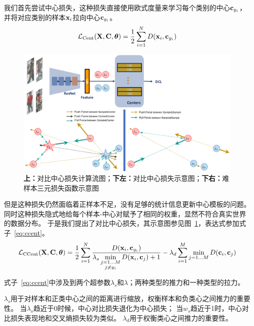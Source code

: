 我们首先尝试中心损失，这种损失直接使用欧式度量来学习每个类别的中心${\mathbf{c}}_{y_i}$，并将对应类别的样本${\mathbf{x}}_i$拉向中心${\mathbf{c}}_{y_i}$。
\begin{equation}
	\mathcal{L}_{\textrm{Cent}} ({\mathbf{X}}, {\mathbf{C}}, {\boldsymbol{\theta}}) = \frac{1}{2}
	\sum_{i=1}^{N}  D(
	{\mathbf{x}}_i , {\mathbf{c}}_{y_i} )
\end{equation}

\begin{figure}
	\centering
	\includegraphics[width=.9\textwidth]{fig/2018-05-15-14-38-39.png}
	\caption{
		\textbf{上：}对比中心损失计算流图；\textbf{下左：}对比中心损失示意图；\textbf{下右：}难样本三元损失函数示意图
	}
	\label{fig:dcent}
\end{figure}

但是这种损失仍然面临着正样本不足，没有足够的统计信息更新中心模板的问题。
同时这种损失隐式地给每个样本-中心对赋予了相同的权重，显然不符合真实世界的数据分布。
于是我们提出了对比中心损失，其示意图参见图~\ref{fig:dcent}，表达式参加式子~\ref{eq:ccent}。
\begin{equation}
	\mathcal{L}_{\textrm{CCent}} ({\mathbf{X}}, {\mathbf{C}}, {\boldsymbol{\theta}}) = \frac{1}{2}
	\sum_{i=1}^{N}
	\frac{D(
		{\mathbf{x}}_{i}, {\mathbf{c}}_{y_i}
		)}{ 
		\displaystyle \lambda_s
		\min_{\substack{
				j=1...M \\
				j \neq y_i }}
		D(
		{\mathbf{x}}_{i}, {\mathbf{c}}_{j}
		) + 1 }
	-
	\lambda_d \sum_{i=1}^{M}  \min_{j=1...M} D({\mathbf{c}}_i,{\mathbf{c}}_j)
\label{eq:ccent}
\end{equation}

式子~\ref{eq:ccent}中涉及到两个超参数$\lambda_s$和$\lambda$；两种类型的推力和一种类型的拉力。

$\lambda_s$用于对样本和正类中心之间的距离进行缩放，权衡样本和负类心之间推力的重要性。
当$\lambda_s$趋近于0时候，中心对比损失退化为中心损失；
当$w_s$趋近于1时，中心对比损失表现地和交叉熵损失较为类似。
$\lambda_d$用于权衡类心之间推力的重要性。

